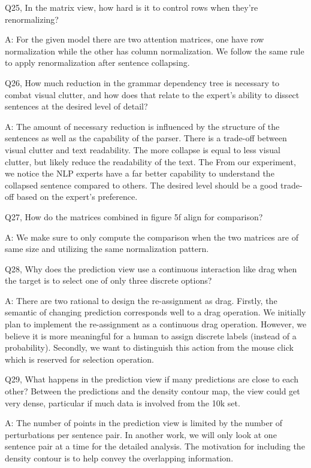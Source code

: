 Q25, In the matrix view, how hard is it to control rows when they're renormalizing?

A: For the given model there are two attention matrices, one have row normalization while the other has column normalization. We follow the same rule to apply renormalization after sentence collapsing.

Q26, How much reduction in the grammar dependency tree is necessary to combat visual clutter, and how does that relate to the expert's ability to dissect sentences at the desired level of detail?

A: The amount of necessary reduction is influenced by the structure of the sentences as well as the capability of the parser. There is a trade-off between visual clutter and text readability. The more collapse is equal to less visual clutter, but likely reduce the readability of the text. The From our experiment, we notice the NLP experts have a far better capability to understand the collapsed sentence compared to others. The desired level should be a good trade-off based on the expert's preference.


Q27, How do the matrices combined in figure 5f align for comparison?

A: We make sure to only compute the comparison when the two matrices are of same size and utilizing the same normalization pattern.


Q28, Why does the prediction view use a continuous interaction like drag when the target is to select one of only three discrete options?

A: There are two rational to design the re-assignment as drag. Firstly, the semantic of changing prediction corresponds well to a drag operation. We initially plan to implement the re-assignment as a continuous drag operation. However, we believe it is more meaningful for a human to assign discrete labels (instead of a probability). Secondly, we want to distinguish this action from the mouse click which is reserved for selection operation.


Q29, What happens in the prediction view if many predictions are close to each other? Between the predictions and the density contour map, the view could get very dense, particular if much data is involved from the 10k set.

A: The number of points in the prediction view is limited by the number of perturbations per sentence pair. In another work, we will only look at one sentence pair at a time for the detailed analysis. The motivation for including the density contour is to help convey the overlapping information.


